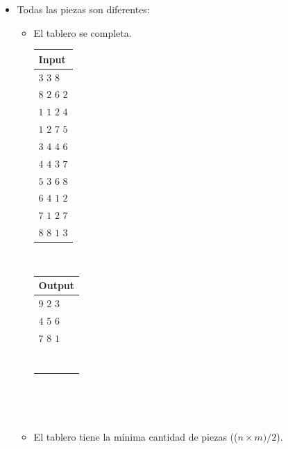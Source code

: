 \documentclass[11pt, a4paper, twoside]{article}
\begin{document}
\begin{itemize}
\begin{itemize}
	\end{itemize}
\item Todas las piezas son diferentes:
     \begin{itemize}
		\item El tablero se completa. \\
		
		    \begin{minipage}{0.2\textwidth}
				\begin{tabular}{l}
					Input  \\
					\hline
					$3$ $3$ $8$     \\
				    $8$ $2$ $6$ $2$ \\ 
					$1$ $1$ $2$ $4$ \\
					$1$ $2$ $7$ $5$ \\
					$3$ $4$ $4$ $6$ \\
					$4$ $4$ $3$ $7$ \\
					$5$ $3$ $6$ $8$ \\
					$6$ $4$ $1$ $2$ \\
					$7$ $1$ $2$ $7$ \\
					$8$ $8$ $1$ $3$ \\
				\end{tabular} \\  
			\end{minipage}
			\begin{minipage}{0.2\textwidth}	
				\begin{tabular}{l}
					Output  \\
					\hline
					$9$ $2$ $3$ \\
					$4$ $5$ $6$ \\
					$7$ $8$ $1$ \\
					\\
					\\
					\\
					\\
					\\
					\\
					\\
				\end{tabular} \\
			\end{minipage} \\
		
		\item El tablero tiene la mínima cantidad de piezas (($n \times m)/2$). \\
		

\end{itemize}
\end{itemize}
\end{document}
